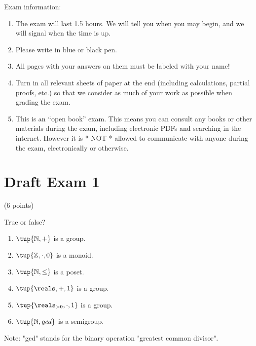 \documentclass[paper=8.125in:10.250in,pagesize=pdftex,
    headinclude=false,footinclude=false,oneside,egregdoesnotlikesansseriftitles]{kaobook}
\begin{document}
Exam information: 
\begin{enumerate}
\item The exam will last 1.5 hours. We will tell you when you may begin, and we will signal when the time is up. 
\item Please write in blue or black pen. 
\item All pages with your answers on them must be labeled with your name!
\item Turn in all relevant sheets of paper at the end (including calculations, partial proofs, etc.) so that we consider as much of your work as possible when grading the exam. 
\item This is an ``open book'' exam. This means you can consult any books or other materials during the exam, including electronic PDFs and searching in the internet. However it is * NOT * allowed to communicate with anyone during the exam, electronically or otherwise. 
\end{enumerate}

\newpage

\section*{Draft Exam 1}


\begin{gradedexercise}\label{ex:AlgebraicGadgets}
(6 points) 
\

True or false? 
\begin{enumerate}
\item $\tup{\mathbb{N}, +}$ is a group. 
\item $\tup{\mathbb{Z}, \cdot, 0}$ is a monoid. 
\item $\tup{\mathbb{N}, \leq}$ is a poset. 
\item $\tup{\reals, +, 1}$ is a group.
\item $\tup{\reals_{>0}, \cdot, 1}$ is a group. 
\item $\tup{\mathbb{N}, gcd}$ is a semigroup. 
\end{enumerate}
Note: "gcd" stands for the binary operation "greatest common divisor". 
\end{gradedexercise}


\newpage
\end{document}
